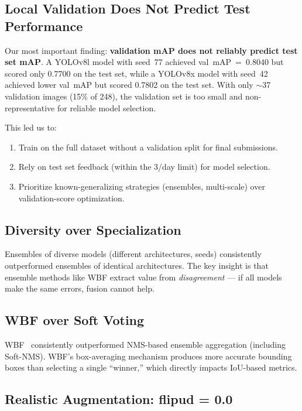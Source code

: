 \documentclass[11pt,a4paper]{article}
\begin{document}
\subsection{Local Validation Does Not Predict Test Performance}

Our most important finding: \textbf{validation mAP does not reliably predict test set mAP}.
A YOLOv8l model with seed~77 achieved val~mAP~=~0.8040 but scored only 0.7700 on the test set, while a YOLOv8x model with seed~42 achieved lower val~mAP but scored 0.7802 on the test set.
With only $\sim$37 validation images (15\% of 248), the validation set is too small and non-representative for reliable model selection.

This led us to:
\begin{enumerate}    \item Train on the full dataset without a validation split for final submissions.
    \item Rely on test set feedback (within the 3/day limit) for model selection.
    \item Prioritize known-generalizing strategies (ensembles, multi-scale) over validation-score optimization.
\end{enumerate}

\subsection{Diversity over Specialization}

Ensembles of diverse models (different architectures, seeds) consistently outperformed ensembles of identical architectures.
The key insight is that ensemble methods like WBF extract value from \emph{disagreement} --- if all models make the same errors, fusion cannot help.

\subsection{WBF over Soft Voting}

WBF~\citep{solovyev2021wbf} consistently outperformed NMS-based ensemble aggregation (including Soft-NMS).
WBF's box-averaging mechanism produces more accurate bounding boxes than selecting a single ``winner,'' which directly impacts IoU-based metrics.

\subsection{Realistic Augmentation: flipud = 0.0}
\end{document}

